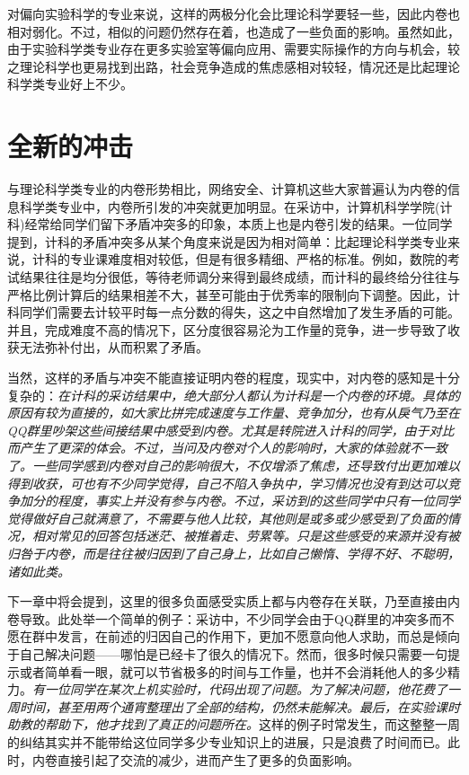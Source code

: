 \documentclass[UTF8,a4paper,fontset=windows,11pt,openany]{ctexbook}
\begin{document}
对偏向实验科学的专业来说，这样的两极分化会比理论科学要轻一些，因此内卷也相对弱化。不过，相似的问题仍然存在着，也造成了一些负面的影响。虽然如此，由于实验科学类专业存在更多实验室等偏向应用、需要实际操作的方向与机会，较之理论科学也更易找到出路，社会竞争造成的焦虑感相对较轻，情况还是比起理论科学类专业好上不少。

\section{全新的冲击}

与理论科学类专业的内卷形势相比，网络安全、计算机这些大家普遍认为内卷的信息科学类专业中，内卷所引发的冲突就更加明显。在采访中，计算机科学学院(计科)经常给同学们留下矛盾冲突多的印象，本质上也是内卷引发的结果。一位同学提到，计科的矛盾冲突多从某个角度来说是因为相对简单：比起理论科学类专业来说，计科的专业课难度相对较低，但是有很多精细、严格的标准。例如，数院的考试结果往往是均分很低，等待老师调分来得到最终成绩，而计科的最终给分往往与严格比例计算后的结果相差不大，甚至可能由于优秀率的限制向下调整。因此，计科同学们需要去计较平时每一点分数的得失，这之中自然增加了发生矛盾的可能。并且，完成难度不高的情况下，区分度很容易沦为工作量的竞争，进一步导致了收获无法弥补付出，从而积累了矛盾。

当然，这样的矛盾与冲突不能直接证明内卷的程度，现实中，对内卷的感知是十分复杂的：\emph{在计科的采访结果中，绝大部分人都认为计科是一个内卷的环境。具体的原因有较为直接的，如大家比拼完成速度与工作量、竞争加分，也有从戾气乃至在QQ群里吵架这些间接结果中感受到内卷。尤其是转院进入计科的同学，由于对比而产生了更深的体会。不过，当问及内卷对个人的影响时，大家的体验就不一致了。一些同学感到内卷对自己的影响很大，不仅增添了焦虑，还导致付出更加难以得到收获，可也有不少同学觉得，自己不陷入争执中，学习情况也没有到达可以竞争加分的程度，事实上并没有参与内卷。不过，采访到的这些同学中只有一位同学觉得做好自己就满意了，不需要与他人比较，其他则是或多或少感受到了负面的情况，相对常见的回答包括迷茫、被推着走、劳累等。只是这些感受的来源并没有被归咎于内卷，而是往往被归因到了自己身上，比如自己懒惰、学得不好、不聪明，诸如此类。}

下一章中将会提到，这里的很多负面感受实质上都与内卷存在关联，乃至直接由内卷导致。此处举一个简单的例子：采访中，不少同学会由于QQ群里的冲突多而不愿在群中发言，在前述的归因自己的作用下，更加不愿意向他人求助，而总是倾向于自己解决问题——哪怕是已经卡了很久的情况下。然而，很多时候只需要一句提示或者简单看一眼，就可以节省极多的时间与工作量，也并不会消耗他人的多少精力。\emph{有一位同学在某次上机实验时，代码出现了问题。为了解决问题，他花费了一周时间，甚至用两个通宵整理出了全部的结构，仍然未能解决。最后，在实验课时助教的帮助下，他才找到了真正的问题所在。}这样的例子时常发生，而这整整一周的纠结其实并不能带给这位同学多少专业知识上的进展，只是浪费了时间而已。此时，内卷直接引起了交流的减少，进而产生了更多的负面影响。
\end{document}
